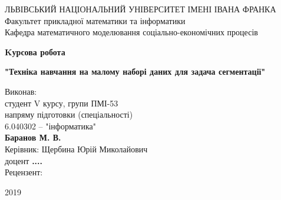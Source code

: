 \begin{titlepage}
\begin{center}

ЛЬВІВСЬКИЙ НАЦІОНАЛЬНИЙ УНІВЕРСИТЕТ ІМЕНІ ІВАНА ФРАНКА\\
Факультет прикладної математики та інформатики\\
Кафедра  математичного моделювання соціально-економічних процесів
\end{center}


\vspace{10em}

\begin{center}
\begin{center}
\textbf{ \Large Kурсова робота}
\end{center}

\textbf{"Техніка навчання на малому наборі даних для задача сегментації"}
\end{center}
\vspace{14em}
\begin{flushright}
Виконав: \\

студент V курсу, групи ПМІ-53 \\
напряму підготовки (спеціальності)\\ 
6.040302 -- "інформатика" \\
\textbf {Баранов М. В.} \\
{Керівник: Щербина Юрій Миколайович\\}
{доцент} \textbf{....} \\
{Рецензент:\\}
\underline{\;\;\;\;\;\;\;\;\;\;\;\;\;\;\;\;\;\;\;\;\;\;\;\;\;\;\;\;\;\;\;\;\;\;\;\;\;\;\;\;\;\;\;\;}
\end{flushright}

\vspace{\fill}

\begin{center}
2019
\end{center}

\end{titlepage}